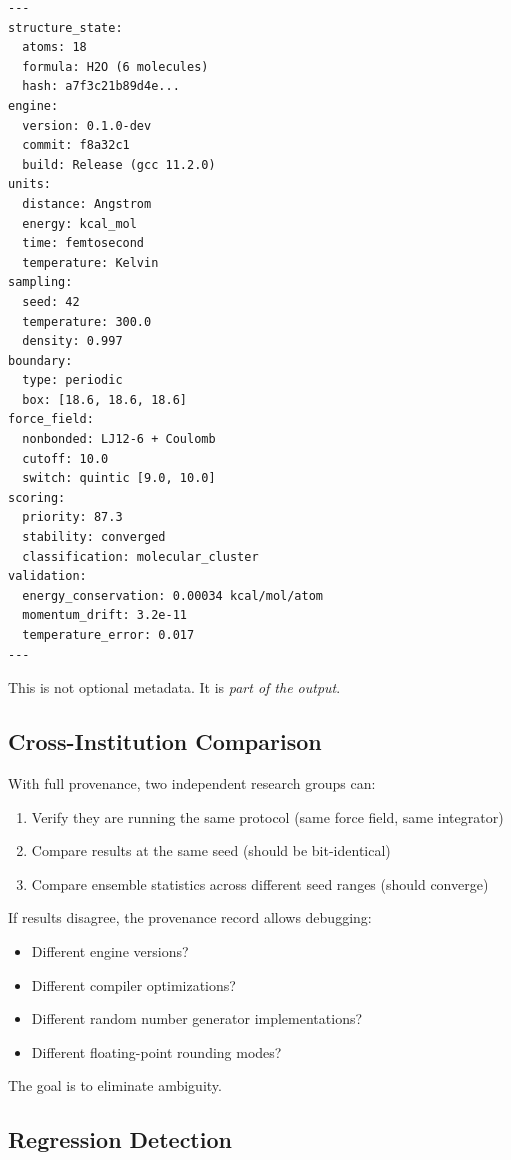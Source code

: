 \documentclass[11pt]{article}
\begin{document}
\begin{verbatim}
---
structure_state:
  atoms: 18
  formula: H2O (6 molecules)
  hash: a7f3c21b89d4e...
engine:
  version: 0.1.0-dev
  commit: f8a32c1
  build: Release (gcc 11.2.0)
units:
  distance: Angstrom
  energy: kcal_mol
  time: femtosecond
  temperature: Kelvin
sampling:
  seed: 42
  temperature: 300.0
  density: 0.997
boundary:
  type: periodic
  box: [18.6, 18.6, 18.6]
force_field:
  nonbonded: LJ12-6 + Coulomb
  cutoff: 10.0
  switch: quintic [9.0, 10.0]
scoring:
  priority: 87.3
  stability: converged
  classification: molecular_cluster
validation:
  energy_conservation: 0.00034 kcal/mol/atom
  momentum_drift: 3.2e-11
  temperature_error: 0.017
---
\end{verbatim}

This is not optional metadata. It is \textit{part of the output}.

\subsection{Cross-Institution Comparison}

With full provenance, two independent research groups can:

\begin{enumerate}
\item Verify they are running the same protocol (same force field, same integrator)
\item Compare results at the same seed (should be bit-identical)
\item Compare ensemble statistics across different seed ranges (should converge)
\end{enumerate}

If results disagree, the provenance record allows debugging:

\begin{itemize}
\item Different engine versions?
\item Different compiler optimizations?
\item Different random number generator implementations?
\item Different floating-point rounding modes?
\end{itemize}

The goal is to eliminate ambiguity.

\subsection{Regression Detection}
\end{document}
